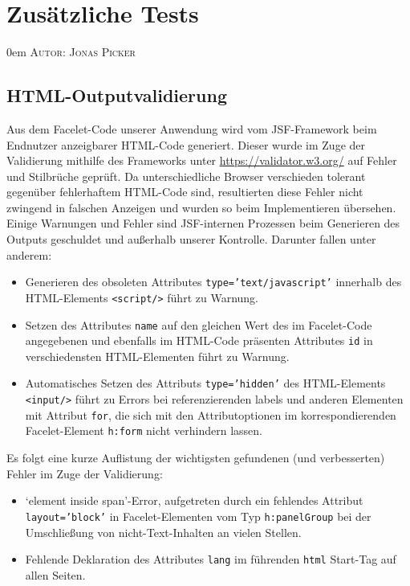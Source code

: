 \documentclass{article}
\makeatletter
\newcommand{\sectionauthor}[1]{
	{\parindent 0em \large \scshape Autor: #1 \par \nobreak \vspace*{1em}}
	\@afterheading
}
\makeatother
\begin{document}
%
%

\newpage

\section{Zusätzliche Tests}
\sectionauthor{Jonas Picker}
\subsection{HTML-Outputvalidierung}
Aus dem Facelet-Code unserer Anwendung wird vom JSF-Framework beim Endnutzer anzeigbarer HTML-Code generiert. Dieser wurde im Zuge der Validierung mithilfe des Frameworks unter  \url{https://validator.w3.org/} auf Fehler und Stilbrüche geprüft. Da unterschiedliche Browser verschieden tolerant gegenüber fehlerhaftem HTML-Code sind, resultierten diese Fehler nicht zwingend in falschen Anzeigen und wurden so beim Implementieren übersehen. Einige Warnungen und Fehler sind JSF-internen Prozessen beim Generieren des Outputs geschuldet und außerhalb unserer Kontrolle. Darunter fallen unter anderem:
\begin{itemize}
\item Generieren des obsoleten Attributes \texttt{type='text/javascript'} innerhalb des HTML-Elements \texttt{<script/>} führt zu Warnung.
\item Setzen des Attributes \texttt{name} auf den gleichen Wert des im Facelet-Code angegebenen und ebenfalls im HTML-Code präsenten Attributes \texttt{id} in verschiedensten HTML-Elementen führt zu Warnung.
\item Automatisches Setzen des Attributs \texttt{type='hidden'} des HTML-Elements \texttt{<input/>} führt zu Errors bei referenzierenden labels und anderen Elementen mit Attribut \texttt{for}, die sich mit den Attributoptionen im korrespondierenden Facelet-Element \texttt{h:form} nicht verhindern lassen.
\end{itemize}
Es folgt eine kurze Auflistung der wichtigsten gefundenen (und verbesserten) Fehler im Zuge der Validierung:
\begin{itemize}
\item `element inside span'-Error, aufgetreten durch ein fehlendes Attribut \texttt{layout='block'} in Facelet-Elementen vom Typ \texttt{h:panelGroup} bei der Umschließung von nicht-Text-Inhalten an vielen Stellen.
\item Fehlende Deklaration des Attributes \texttt{lang} im führenden \texttt{html} Start-Tag auf allen Seiten.
\end{itemize}
\end{document}
